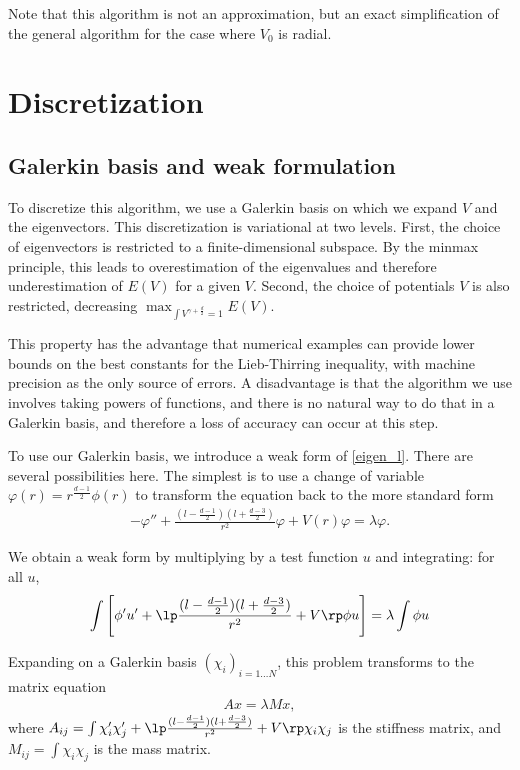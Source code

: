 \documentclass[10pt,a4paper,reqno]{amsart}
\begin{document}
Note that this algorithm is not an approximation, but an exact
simplification of the general algorithm for the case where $V_{0}$ is
radial.
\section{Discretization}
\subsection{Galerkin basis and weak formulation}
To discretize this algorithm, we use a Galerkin basis on which we
expand $V$ and the eigenvectors. This discretization is variational at
two levels. First, the choice of eigenvectors is restricted to a
finite-dimensional subspace. By the minmax principle, this leads to
overestimation of the eigenvalues and therefore underestimation of
$E(V)$ for a given $V$. Second, the choice of potentials $V$ is also
restricted, decreasing $\max_{\int V^{\gamma+\frac d 2} = 1}
E(V)$.

This property has the advantage that numerical examples can provide
lower bounds on the best constants for the Lieb-Thirring inequality,
with machine precision as the only source of errors. A disadvantage is
that the algorithm we use involves taking powers of functions, and
there is no natural way to do that in a Galerkin basis, and therefore
a loss of accuracy can occur at this step.

To use our Galerkin basis, we introduce a weak form of
\eqref{eigen_l}. There are several possibilities here. The simplest is
to use a change of variable $\varphi(r) = r^{\frac{d-1}2} \phi(r)$
to transform the equation back to the more standard form
\begin{align*}
  - \varphi'' + \frac {(l-\frac{d-1}{2})(l+\frac{d-3}{2})}{r^{2}}
\varphi + V(r)\varphi = \lambda \varphi.
\end{align*}

We obtain a weak form by multiplying by a test function $u$ and
integrating: for all $u$, 
\begin{align}
  \label{eigen_l_weak_bad}
  \int\left[ \phi' u' + \lp\frac {(l-\frac{d-1}{2})(l+\frac{d-3}{2})}{r^{2}}
    + V\rp \phi u\right] = \lambda \int \phi u
\end{align}

Expanding on a Galerkin basis $(\chi_{i})_{i=1\dots N}$, this problem transforms to
the matrix equation
\begin{align*}
  A x = \lambda M x,
\end{align*}
where $A_{ij} = \int \chi_{i}' \chi_{j}' +
\lp\frac{(l-\frac{d-1}{2})(l+\frac{d-3}{2})}{r^{2}} + V\rp\chi_{i} \chi_{j}$ is the
stiffness matrix, and $M_{ij} = \int \chi_{i} \chi_{j}$ is the mass
matrix.
\end{document}
